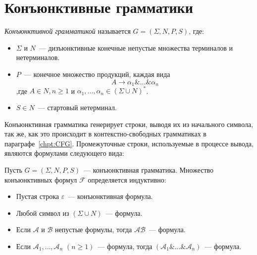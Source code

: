 \section{Конъюнктивные грамматики}
\label{sec:ConjunctiveGrammars}

\begin{definition}
    \textit{Конъюнктивной грамматикой} называется $G = (\Sigma,N,P,S)$, где:
    \begin{itemize}
        \item $\Sigma$ и $N$~--- дизъюнктивные конечные непустые множества терминалов и нетерминалов.
        \item $P$~--- конечное множество продукций, каждая вида
        \[
        A\rightarrow \alpha_1\&...\&\alpha_n
        \]
        ,где $A \in N,n \geq 1$ и $\alpha_1,...,\alpha_n \in (\Sigma \cup N)^*$.
        \item $S \in N$~--- стартовый нетерминал.
    \end{itemize}
\end{definition}

Конъюнктивная грамматика генерирует строки, выводя их из начального символа, так же, как это происходит в контекстно-свободных грамматиках в параграфе~\ref{chpt:CFG}. Промежуточные строки, используемые в процессе вывода, являются формулами следующего вида:

\begin{definition}\label{def:ConjunctiveFormula}
    Пусть $G = (\Sigma,N,P,S)$~--- конъюнктивная грамматика. Множество конъюнктивных формул $ \mathcal{F}$ определяется индуктивно:
    \begin{itemize}
        \item Пустая строка $\varepsilon$~--- конъюнктивная формула.
        \item Любой символ из $(\Sigma \cup N)$~--- формула.
        \item Если $\mathcal{A}$ и $\mathcal{B}$ непустые формулы, тогда $\mathcal{AB}$~--- формула.
        \item Если $\mathcal{A}_1,\ldots,\mathcal{A}_n$ $(n \geqslant 1)$~--- формула, тогда $(\mathcal{A}_1\&\ldots\&\mathcal{A}_n)$~--- формула.
    \end{itemize}
\end{definition}

